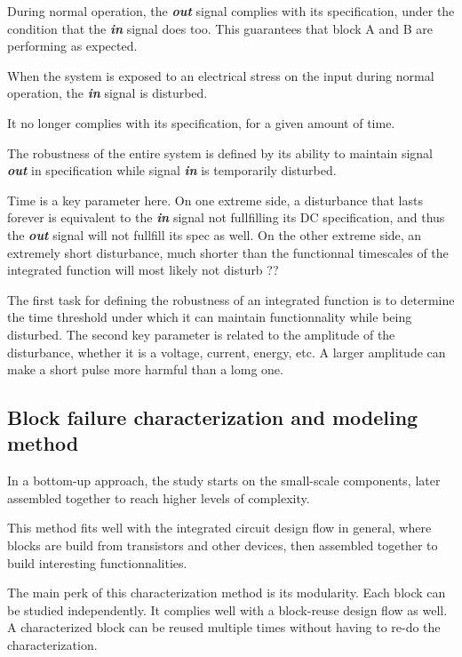 During normal operation, the \textbf{\textit{out}} signal complies with its specification,
under the condition that the \textbf{\textit{in}} signal does too.
This guarantees that block A and B are performing as expected.

When the system is exposed to an electrical stress on the input during normal operation,
the \textbf{\textit{in}} signal is disturbed.

It no longer complies with its specification, for a given amount of time.

The robustness of the entire system is defined by its ability to maintain signal \textbf{\textit{out}} in specification
while signal \textbf{\textit{in}} is temporarily disturbed.

Time is a key parameter here. On one extreme side, a disturbance that lasts forever is equivalent to the \textbf{\textit{in}} signal not fullfilling its DC specification,
and thus the \textbf{\textit{out}} signal will not fullfill its spec as well.
On the other extreme side, an extremely short disturbance, much shorter than the functionnal timescales of the integrated function will most likely not disturb ??

The first task for defining the robustness of an integrated function is to determine the time threshold under which it can maintain functionnality while being disturbed.
The second key parameter is related to the amplitude of the disturbance, whether it is a voltage, current, energy, etc.
A larger amplitude can make a short pulse more harmful than a lomg one.

\subsection{Block failure characterization and modeling method}

In a bottom-up approach, the study starts on the small-scale components,
later assembled together to reach higher levels of complexity.

This method fits well with the integrated circuit design flow in general,
where blocks are build from transistors and other devices, then assembled together to build interesting functionnalities.

The main perk of this characterization method is its modularity.
Each block can be studied independently.
It complies well with a block-reuse design flow as well.
A characterized block can be reused multiple times without having to re-do the characterization.

